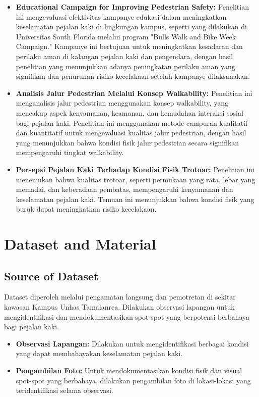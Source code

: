 \documentclass[12pt,a4paper]{article}
\begin{document}
\begin{itemize}
    \item \textbf{Educational Campaign for Improving Pedestrian Safety:} Penelitian ini mengevaluasi efektivitas kampanye edukasi dalam meningkatkan keselamatan pejalan kaki di lingkungan kampus, seperti yang dilakukan di Universitas South Florida melalui program "Bulls Walk and Bike Week Campaign." Kampanye ini bertujuan untuk meningkatkan kesadaran dan perilaku aman di kalangan pejalan kaki dan pengendara, dengan hasil penelitian yang menunjukkan adanya peningkatan perilaku aman yang signifikan dan penurunan risiko kecelakaan setelah kampanye dilaksanakan.
    \item \textbf{Analisis Jalur Pedestrian Melalui Konsep Walkability:} Penelitian ini menganalisis jalur pedestrian menggunakan konsep walkability, yang mencakup aspek kenyamanan, keamanan, dan kemudahan interaksi sosial bagi pejalan kaki. Penelitian ini menggunakan metode campuran kualitatif dan kuantitatif untuk mengevaluasi kualitas jalur pedestrian, dengan hasil yang menunjukkan bahwa kondisi fisik jalur pedestrian secara signifikan mempengaruhi tingkat walkability.
    \item \textbf{Persepsi Pejalan Kaki Terhadap Kondisi Fisik Trotoar:} Penelitian ini menemukan bahwa kualitas trotoar, seperti permukaan yang rata, lebar yang memadai, dan keberadaan pembatas, mempengaruhi kenyamanan dan keselamatan pejalan kaki. Temuan ini menunjukkan bahwa kondisi fisik yang buruk dapat meningkatkan risiko kecelakaan.
\end{itemize}

\newpage
\section{Dataset and Material}
\subsection{Source of Dataset}
Dataset diperoleh melalui pengamatan langsung dan pemotretan di sekitar kawasan Kampus Unhas Tamalanrea. Dilakukan observasi lapangan untuk mengidentifikasi dan mendokumentasikan spot-spot yang berpotensi berbahaya bagi pejalan kaki.

\begin{itemize}
    \item \textbf{Observasi Lapangan:} Dilakukan untuk mengidentifikasi berbagai kondisi yang dapat membahayakan keselamatan pejalan kaki.
    \item \textbf{Pengambilan Foto:} Untuk mendokumentasikan kondisi fisik dan visual spot-spot yang berbahaya, dilakukan pengambilan foto di lokasi-lokasi yang teridentifikasi selama observasi.
\end{itemize}
\end{document}
